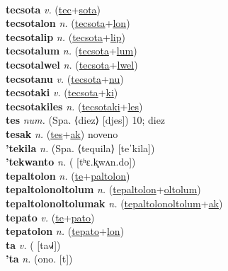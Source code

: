  \label{tecwelon} \\
\textbf{tecsota} \textit{v.} (\hyperref[tec]{tec}+\hyperref[sota]{sota})
 \label{tecsota} \\
\textbf{tecsotalon} \textit{n.} (\hyperref[tecsota]{tecsota}+\hyperref[lon]{lon})
 \label{tecsotalon} \\
\textbf{tecsotalip} \textit{n.} (\hyperref[tecsota]{tecsota}+\hyperref[lip]{lip})
 \label{tecsotalip} \\
\textbf{tecsotalum} \textit{n.} (\hyperref[tecsota]{tecsota}+\hyperref[lum]{lum})
 \label{tecsotalum} \\
\textbf{tecsotalwel} \textit{n.} (\hyperref[tecsota]{tecsota}+\hyperref[lwel]{lwel})
 \label{tecsotalwel} \\
\textbf{tecsotanu} \textit{v.} (\hyperref[tecsota]{tecsota}+\hyperref[nu]{nu})
 \label{tecsotanu} \\
\textbf{tecsotaki} \textit{v.} (\hyperref[tecsota]{tecsota}+\hyperref[ki]{ki})
 \label{tecsotaki} \\
\textbf{tecsotakiles} \textit{n.} (\hyperref[tecsotaki]{tecsotaki}+\hyperref[les]{les})
 \label{tecsotakiles} \\
\textbf{tes} \textit{num.} (Spa. ⟨diez⟩ [djes])
10; diez \label{tes} \\
\textbf{tesak} \textit{n.} (\hyperref[tes]{tes}+\hyperref[ak]{ak})
noveno \label{tesak} \\
\textbf{'tekila} \textit{n.} (Spa. ⟨tequila⟩ [teˈkila])
 \label{'tekila} \\
\textbf{'tekwanto} \textit{n.} ( [tʰɛ.k͈wʌn.do])
 \label{'tekwanto} \\
\textbf{tepaltolon} \textit{n.} (\hyperref[te]{te}+\hyperref[paltolon]{paltolon})
 \label{tepaltolon} \\
\textbf{tepaltolonoltolum} \textit{n.} (\hyperref[tepaltolon]{tepaltolon}+\hyperref[oltolum]{oltolum})
 \label{tepaltolonoltolum} \\
\textbf{tepaltolonoltolumak} \textit{n.} (\hyperref[tepaltolonoltolum]{tepaltolonoltolum}+\hyperref[ak]{ak})
 \label{tepaltolonoltolumak} \\
\textbf{tepato} \textit{v.} (\hyperref[te]{te}+\hyperref[pato]{pato})
 \label{tepato} \\
\textbf{tepatolon} \textit{n.} (\hyperref[tepato]{tepato}+\hyperref[lon]{lon})
 \label{tepatolon} \\
\textbf{ta} \textit{v.} ( [ta˧˩˧])
 \label{ta} \\
\textbf{'ta} \textit{n.} (ono. [t])
